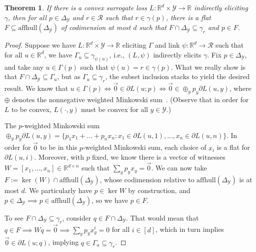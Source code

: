 \documentclass{article}
\newcommand{\Comments}{1}
\newcommand{\mynote}[2]{\ifnum\Comments=1\textcolor{#1}{#2}\fi}
\newcommand{\jessie}[1]{\mynote{purple}{[JF: #1]}}
\newcommand{\reals}{\mathbb{R}}
\newcommand{\simplex}{\Delta_\Y}
\newcommand{\affhull}{\mathrm{affhull}}
\newcommand{\R}{\mathcal{R}}
\newcommand{\Y}{\mathcal{Y}}
\newtheorem{theorem}{Theorem}
\begin{document}
\begin{theorem}\label{thm:cvx-flats}
%	
	If there is a convex surrogate loss $L : \reals^d \times\Y \to \reals$ indirectly eliciting $\gamma$, then for all $p \in \simplex$ and $r \in \R$ such that $r \in \gamma(p)$, there is a flat $F \subseteq \affhull(\simplex)$ of codimension at most $d$ such that $F \cap \simplex \subseteq \gamma_r$ and $p \in F$.
\end{theorem}
\begin{proof}
%	
	Suppose we have $L:\reals^d \times \Y \to \reals$ eliciting $\Gamma$ and link $\psi : \reals^d \to \R$ such that for all $u \in \reals^d$, we have $\Gamma_u \subseteq \gamma_{\psi(u)}$, i.e., $(L, \psi)$ indirectly elicits $\gamma$.
	Fix $p \in \simplex$, and take any $u \in \Gamma(p)$ such that $\psi(u) = r \in \gamma(p)$.
	What we really show is that $F \cap \simplex \subseteq \Gamma_u$, but as $\Gamma_u \subseteq \gamma_r$, the subset inclusion stacks to yield the desired result.
	We know that $u \in \Gamma(p) \iff \vec 0 \in \partial L(u; p) \iff \vec 0 \in \oplus_y p_y \partial L(u,y)$, where $\oplus$ denotes the nonnegative weighted Minkowski sum~\citep[Theorem 4.1.1]{hiriart2012fundamentals}.  (Observe that in order for $L$ to be convex, $L(\cdot, y)$ must be convex for all $y \in \Y$.) 
	
	The $p$-weighted Minkowski sum $\oplus_y p_y \partial L(u,y) = \{p_1 x_1 + \ldots + p_n x_n : x_1 \in \partial L(u,1), \ldots, x_n \in \partial L(u,n) \}$.
	In order for $\vec 0$ to be in this $p$-weighted Minkowski sum, each choice of $x_i$ is a flat for $\partial L(u, i)$.
	Moreover, with $p$ fixed, we know there is a vector of witnesses $W = [x_1, \ldots, x_n] \in \reals^{d\times n}$ such that $\sum_y p_y x_y = \vec 0$.%
	We can now take $F := \ker(W) \cap \affhull(\simplex)$, whose codimension relative to $\affhull(\simplex)$ is at most $d$.
	We particularly have $p \in \ker W$ by construction, and $p \in \simplex \implies p \in \affhull(\simplex)$, so we have $p \in F$.

	To see $F \cap \simplex \subseteq \gamma_r$, consider $q \in F \cap \simplex$.
	That would mean that $q \in F \implies Wq = \vec 0 \implies \sum_y p_y x_y^i = 0$ for all $i \in [d]$, which in turn implies $\vec 0 \in \partial L(u;q)$, implying $q \in \Gamma_u \subseteq \gamma_{r}$.
\end{proof}
\end{document}
